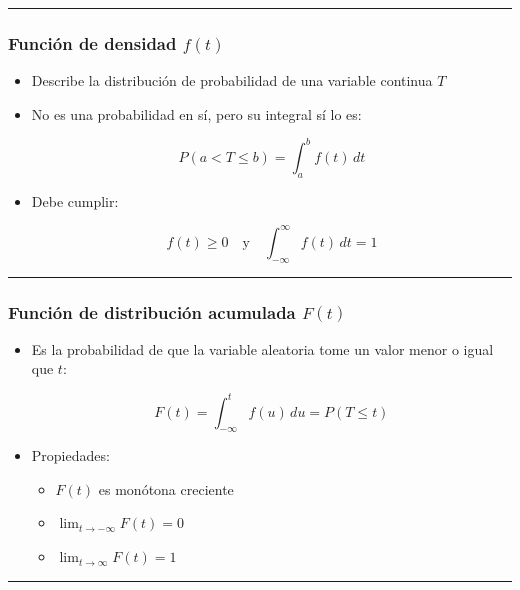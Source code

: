 \documentclass[
  letterpaper,
  ignorenonframetext,
  DIV=11,
  numbers=noendperiod]{scrartcl}
\providecommand{\tightlist}{%
  \setlength{\itemsep}{0pt}\setlength{\parskip}{0pt}}\usepackage{longtable,booktabs,array}
\begin{document}
\begin{center}\rule{0.5\linewidth}{0.5pt}\end{center}

\subsubsection{\texorpdfstring{Función de densidad
\(f(t)\)}{Función de densidad f(t)}}\label{funciuxf3n-de-densidad-ft}

\begin{itemize}
\item
  Describe la distribución de probabilidad de una variable continua
  \(T\)
\item
  No es una probabilidad en sí, pero su integral sí lo es:

  \[
  P(a < T \leq b) = \int_a^b f(t) \, dt
  \]
\item
  Debe cumplir:

  \[
  f(t) \geq 0 \quad \text{y} \quad \int_{-\infty}^{\infty} f(t) \, dt = 1
  \]
\end{itemize}

\begin{center}\rule{0.5\linewidth}{0.5pt}\end{center}

\subsubsection{\texorpdfstring{Función de distribución acumulada
\(F(t)\)}{Función de distribución acumulada F(t)}}\label{funciuxf3n-de-distribuciuxf3n-acumulada-ft}

\begin{itemize}
\item
  Es la probabilidad de que la variable aleatoria tome un valor menor o
  igual que \(t\):

  \[
  F(t) = \int_{-\infty}^t f(u) \, du = P(T \leq t)
  \]
\item
  Propiedades:

  \begin{itemize}
  \tightlist
  \item
    \(F(t)\) es monótona creciente
  \item
    \(\lim_{t \to -\infty} F(t) = 0\)
  \item
    \(\lim_{t \to \infty} F(t) = 1\)
  \end{itemize}
\end{itemize}

\begin{center}\rule{0.5\linewidth}{0.5pt}\end{center}
\end{document}
